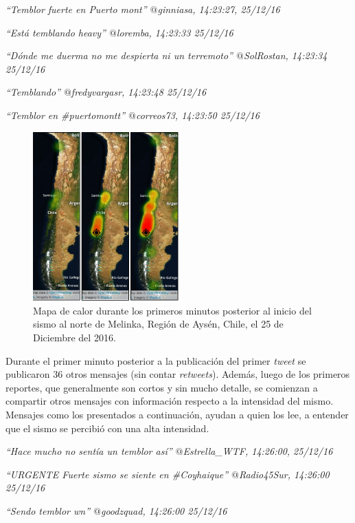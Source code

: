 \textit{``Temblor fuerte en Puerto mont'' $@$ginniasa, 14:23:27, 25/12/16}

\textit{``Está temblando heavy'' $@$loremba, 14:23:33 25/12/16}

\textit{``Dónde me duerma no me despierta ni un terremoto'' $@$SolRostan, 14:23:34 25/12/16}

\textit{``Temblando'' $@$fredyvargasr, 14:23:48 25/12/16}

\textit{``Temblor en \#puertomontt'' $@$correos73, 14:23:50 25/12/16}

	\begin{figure}[!ht]
	  \centering
	  \includegraphics[trim={0 0 0 0}, clip, width=0.5\textwidth]{imagenes/heatmap.pdf}
	  \caption{Mapa de calor durante los primeros minutos posterior al inicio del sismo al norte de Melinka, Región de Aysén, Chile, el 25 de Diciembre del 2016.}
		\label{fig:heatmap-timelapse}
	\end{figure}	
	
	Durante el primer minuto posterior a la publicación del primer \textit{tweet} se publicaron 36 otros mensajes (sin contar \textit{retweets}). Además, luego de los primeros reportes, que generalmente son cortos y sin mucho detalle, se comienzan a compartir otros mensajes con información respecto a la intensidad del mismo. Mensajes como los presentados a continuación, ayudan a quien los lee, a entender que el sismo se percibió con una alta intensidad. 
	

\textit{``Hace mucho no sentía un temblor así'' $@$Estrella\_WTF, 14:26:00, 25/12/16}

\textit{``URGENTE Fuerte sismo se siente en \#Coyhaique'' $@$Radio45Sur, 14:26:00 25/12/16}

\textit{``Sendo temblor wn'' $@$goodzquad, 14:26:00 25/12/16}

